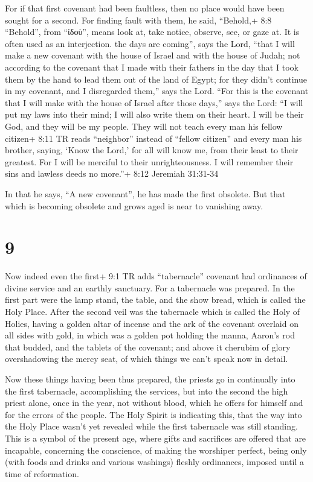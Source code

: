  For if that first covenant had been faultless, then no
place would have been sought for a second.  For finding
fault with them, he said, ``Behold,+ 8:8 ``Behold'', from ``ἰδοὺ'',
means look at, take notice, observe, see, or gaze at. It is often used
as an interjection. the days are coming'', says the Lord, ``that I will
make a new covenant with the house of Israel and with the house of
Judah;  not according to the covenant that I made with their
fathers in the day that I took them by the hand to lead them out of the
land of Egypt; for they didn't continue in my covenant, and I
disregarded them,'' says the Lord.  ``For this is the
covenant that I will make with the house of Israel after those days,''
says the Lord: ``I will put my laws into their mind; I will also write
them on their heart. I will be their God, and they will be my people.
 They will not teach every man his fellow citizen+ 8:11 TR
reads ``neighbor'' instead of ``fellow citizen'' and every man his
brother, saying, `Know the Lord,' for all will know me, from their least
to their greatest.  For I will be merciful to their
unrighteousness. I will remember their sins and lawless deeds no
more.''+ 8:12 Jeremiah 31:31-34

 In that he says, ``A new covenant'', he has made the first
obsolete. But that which is becoming obsolete and grows aged is near to
vanishing away.

\hypertarget{section-8}{%
\section{9}\label{section-8}}

 Now indeed even the first+ 9:1 TR adds ``tabernacle''
covenant had ordinances of divine service and an earthly sanctuary.
 For a tabernacle was prepared. In the first part were the
lamp stand, the table, and the show bread, which is called the Holy
Place.  After the second veil was the tabernacle which is
called the Holy of Holies,  having a golden altar of incense
and the ark of the covenant overlaid on all sides with gold, in which
was a golden pot holding the manna, Aaron's rod that budded, and the
tablets of the covenant;  and above it cherubim of glory
overshadowing the mercy seat, of which things we can't speak now in
detail.

 Now these things having been thus prepared, the priests go
in continually into the first tabernacle, accomplishing the services,
 but into the second the high priest alone, once in the
year, not without blood, which he offers for himself and for the errors
of the people.  The Holy Spirit is indicating this, that the
way into the Holy Place wasn't yet revealed while the first tabernacle
was still standing.  This is a symbol of the present age,
where gifts and sacrifices are offered that are incapable, concerning
the conscience, of making the worshiper perfect,  being
only (with foods and drinks and various washings) fleshly ordinances,
imposed until a time of reformation.

